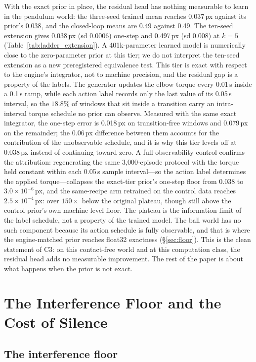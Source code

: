 \documentclass{article}
\begin{document}
With the exact prior in place, the residual head has nothing measurable to learn in the pendulum world: the three-seed trained mean reaches 0.037\,px against its prior's 0.038, and the closed-loop means are 0.49 against 0.49. The ten-seed extension gives 0.038\,px (sd 0.0006) one-step and 0.497\,px (sd 0.008) at $k{=}5$ (Table~\ref{tab:ladder_extension}). A 401k-parameter learned model is numerically close to the zero-parameter prior at this tier; we do not interpret the ten-seed extension as a new preregistered equivalence test. This tier is exact with respect to the engine's integrator, not to machine precision, and the residual gap is a property of the labels. The generator updates the elbow torque every 0.01\,s inside a 0.1\,s ramp, while each action label records only the last value of its 0.05\,s interval, so the $18.8\%$ of windows that sit inside a transition carry an intra-interval torque schedule no prior can observe. Measured with the same exact integrator, the one-step error is 0.018\,px on transition-free windows and 0.079\,px on the remainder; the 0.06\,px difference between them accounts for the contribution of the unobservable schedule, and it is why this tier levels off at 0.038\,px instead of continuing toward zero. A full-observability control confirms the attribution: regenerating the same 3{,}000-episode protocol with the torque held constant within each 0.05\,s sample interval---so the action label determines the applied torque---collapses the exact-tier prior's one-step floor from 0.038 to $3.0\times10^{-6}$\,px, and the same-recipe arm retrained on the control data reaches $2.5\times10^{-4}$\,px: over $150\times$ below the original plateau, though still above the control prior's own machine-level floor. The plateau is the information limit of the label schedule, not a property of the trained model. The ball world has no such component because its action schedule is fully observable, and that is where the engine-matched prior reaches float32 exactness (\S\ref{sec:floor}). This is the clean statement of C3: on this contact-free world and at this computation class, the residual head adds no measurable improvement. The rest of the paper is about what happens when the prior is not exact.

\section{The Interference Floor and the Cost of Silence}\label{sec:silence}

\subsection{The interference floor}
\end{document}
